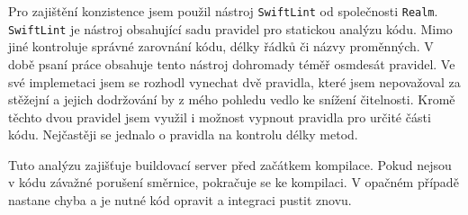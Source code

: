 Pro zajištění konzistence jsem použil nástroj \texttt{SwiftLint} od společnosti \texttt{Realm}.
\texttt{SwiftLint} je nástroj obsahující sadu pravidel pro statickou analýzu kódu.
Mimo jiné kontroluje správné zarovnání kódu, délky řádků či názvy proměnných.
V době psaní práce obsahuje tento nástroj dohromady téměř osmdesát pravidel.
Ve své implemetaci jsem se rozhodl vynechat dvě pravidla, které jsem nepovažoval za stěžejní a jejich dodržování by z mého pohledu vedlo ke snížení čitelnosti.
Kromě těchto dvou pravidel jsem využil i možnost vypnout pravidla pro určité části kódu.
Nejčastěji se jednalo o pravidla na kontrolu délky metod.

Tuto analýzu zajišťuje buildovací server před začátkem kompilace.
Pokud nejsou v kódu závažné porušení směrnice, pokračuje se ke kompilaci.
V opačném případě nastane chyba a je nutné kód opravit a integraci pustit znovu.
